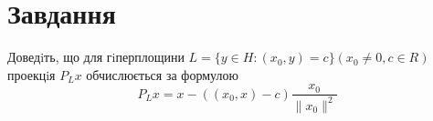 
\chapter{Завдання \theHchapter}


\begin{tcolorbox}[title=Завдання]
    
    Доведiть, що для гiперплощини 
    $ L = \{y \in H : (x_0, y) = c\} (x_0 \neq 0, c \in R)$
    проекцiя $P_Lx$ обчислюється за формулою
    $$ P_Lx = x - ((x_0, x) - c) \frac{x_0}{\| x_0 \| ^ 2} $$
    
\end{tcolorbox}



